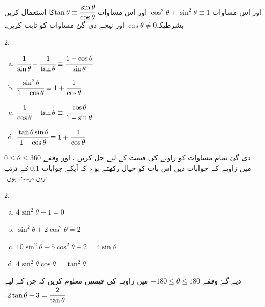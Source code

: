 \begin{enumerate}
                                                                                                                                                                                                                                                                                                                                                                                                                                                                                                
\end{enumerate}

اور اس مساوات  \(\cos^2\theta+\sin^2\theta \equiv1\) اور اس مساوات \(\tan \theta\equiv\cfrac{\sin\theta}{\cos\theta}\)کا استعمال کریں بشرطیکہ\(\cos\theta \neq 0 \) اور نیچے دی گئ مساوات کو ثابت کریں۔
\begin{multicols}{2.}
\begin{enumerate}[a.]
\item
\(\cfrac{1}{\sin\theta}-\cfrac{1}{\tan\theta}\equiv\cfrac{1-\cos\theta}{\sin\theta}\)
\item
 \(\cfrac{\sin^2\theta}{1-\cos\theta}\equiv 1+\cfrac{1}{\cos\theta}\)
\item
\(\cfrac{1}{\cos\theta}+\tan\theta\equiv\cfrac{\cos\theta}{1-\sin\theta} \)
\item
\(\cfrac{\tan\theta\sin\theta}{1-\cos\theta}\equiv1+\cfrac{1}{\cos\theta} \)
\end{enumerate}
\end{multicols}
دی گئ تمام مساوات کو زاویے کی قیمت کے لیے حل کریں ، اور وقفے  \(  0\le \theta\le 360\) میں زاویے کے جوابات دیں اس بات کو خیال رکھتے ہوۓ کہ آپکے جوابات 0.1 کے قرئب ترین درست ہوں۔ 
\begin{multicols}{2.}
\begin{enumerate}[a.]
\item     \(4\sin^2\theta-1=0\)
\item      \(\sin^2\theta+2\cos^2\theta=2 \)
\item \(10\sin^2\theta-5\cos^2\theta+2=4\sin\theta \)
\item    \(4\sin^2\theta\cos\theta=\tan^2\theta\)
\end{enumerate}
\end{multicols}
 دیے گۓ وقفے 
\(-180\le \theta\le 180\) میں   زاویے کی قیمتیں معلوم کریں کہ جن کے لیے  \(2\tan\theta-3=\cfrac{2}{\tan\theta}\)۔


